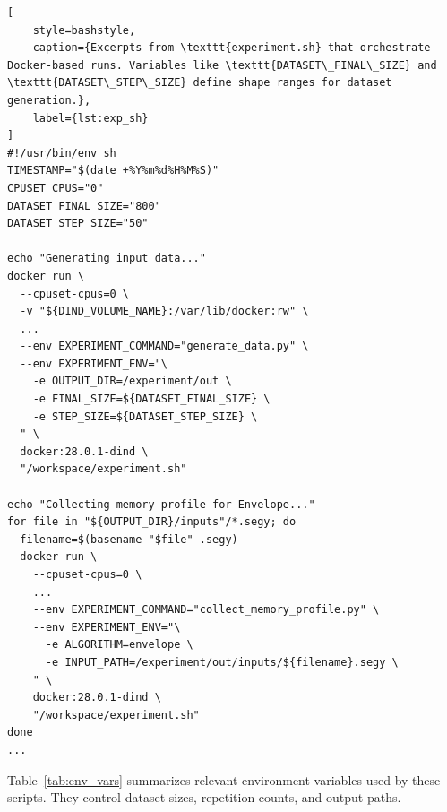 \vspace{1em}
\begin{lstlisting}[
    style=bashstyle,
    caption={Excerpts from \texttt{experiment.sh} that orchestrate Docker-based runs. Variables like \texttt{DATASET\_FINAL\_SIZE} and \texttt{DATASET\_STEP\_SIZE} define shape ranges for dataset generation.},
    label={lst:exp_sh}
]
#!/usr/bin/env sh
TIMESTAMP="$(date +%Y%m%d%H%M%S)"
CPUSET_CPUS="0"
DATASET_FINAL_SIZE="800"
DATASET_STEP_SIZE="50"

echo "Generating input data..."
docker run \
  --cpuset-cpus=0 \
  -v "${DIND_VOLUME_NAME}:/var/lib/docker:rw" \
  ...
  --env EXPERIMENT_COMMAND="generate_data.py" \
  --env EXPERIMENT_ENV="\
    -e OUTPUT_DIR=/experiment/out \
    -e FINAL_SIZE=${DATASET_FINAL_SIZE} \
    -e STEP_SIZE=${DATASET_STEP_SIZE} \
  " \
  docker:28.0.1-dind \
  "/workspace/experiment.sh"

echo "Collecting memory profile for Envelope..."
for file in "${OUTPUT_DIR}/inputs"/*.segy; do
  filename=$(basename "$file" .segy)
  docker run \
    --cpuset-cpus=0 \
    ...
    --env EXPERIMENT_COMMAND="collect_memory_profile.py" \
    --env EXPERIMENT_ENV="\
      -e ALGORITHM=envelope \
      -e INPUT_PATH=/experiment/out/inputs/${filename}.segy \
    " \
    docker:28.0.1-dind \
    "/workspace/experiment.sh"
done
...
\end{lstlisting}

\noindent
Table~\ref{tab:env_vars} summarizes relevant environment variables used by these scripts.
They control dataset sizes, repetition counts, and output paths.


